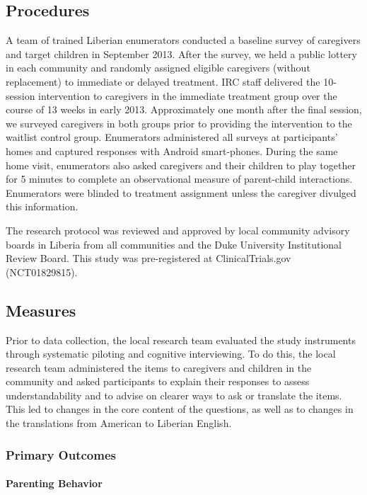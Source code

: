 \documentclass[12pt,authoryear]{elsarticle}\usepackage{knitr}
\begin{document}
\subsection*{Procedures}

A team of trained Liberian enumerators conducted a baseline survey of caregivers and target children in September 2013. After the survey, we held a public lottery in each community and randomly assigned eligible caregivers (without replacement) to immediate or delayed treatment. IRC staff delivered the 10-session intervention to caregivers in the immediate treatment group over the course of 13 weeks in early 2013. Approximately one month after the final session, we surveyed caregivers in both groups prior to providing the intervention to the waitlist control group. Enumerators administered all surveys at participants' homes and captured responses with Android smart-phones. During the same home visit, enumerators also asked caregivers and their children to play together for 5 minutes to complete an observational measure of parent-child interactions. Enumerators were blinded to treatment assignment unless the caregiver divulged this information.
 
The research protocol was reviewed and approved by local community advisory boards in Liberia from all communities and the Duke University Institutional Review Board. This study was pre-registered at ClinicalTrials.gov (NCT01829815). 

\subsection*{Measures}

Prior to data collection, the local research team evaluated the study instruments through systematic piloting and cognitive interviewing. To do this, the local research team administered the items to caregivers and children in the community and asked participants to explain their responses to assess understandability and to advise on clearer ways to ask or translate the items. This led to changes in the core content of the questions, as well as to changes in the translations from American to Liberian English. 

\subsubsection*{Primary Outcomes}

\paragraph*{Parenting Behavior}
\end{document}
